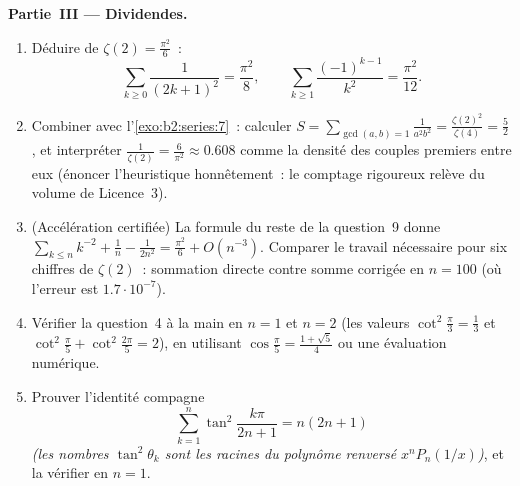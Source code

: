 \begin{problem}[{Problème du week-end --- $\zeta(2) = \pi^2/6$ et le
panorama de Bertrand}]
\medskip
\noindent\textbf{Partie~III --- Dividendes.}
\begin{enumerate}[resume]
  \item Déduire de $\zeta(2) = \frac{\pi^2}6$~:
        \[
        \sum_{k\geq0}\frac{1}{(2k+1)^2} = \frac{\pi^2}{8},
        \qquad
        \sum_{k\geq1}\frac{(-1)^{k-1}}{k^2} = \frac{\pi^2}{12}.
        \]
  \item Combiner avec l'\cref{exo:b2:series:7}~: calculer $S =
        \sum_{\gcd(a,b)=1}\frac{1}{a^2b^2} =
        \frac{\zeta(2)^2}{\zeta(4)} = \frac52$, et interpréter
        $\frac{1}{\zeta(2)} = \frac{6}{\pi^2} \approx 0.608$ comme
        la densité des couples premiers entre eux (énoncer
        l'heuristique honnêtement~: le comptage rigoureux relève du
        volume de Licence~3).
  \item (Accélération certifiée) La formule du reste de la question~9
        donne $\sum_{k\leq n}k^{-2} + \frac1n - \frac1{2n^2} =
        \frac{\pi^2}6 + O(n^{-3})$. Comparer le travail nécessaire
        pour six chiffres de $\zeta(2)$~: sommation directe contre
        somme corrigée en $n = 100$ (où l'erreur est
        $1.7\cdot10^{-7}$).
  \item Vérifier la question~4 à la main en $n = 1$ et $n = 2$ (les
        valeurs $\cot^2\frac\pi3 = \frac13$ et
        $\cot^2\frac\pi5 + \cot^2\frac{2\pi}5 = 2$), en utilisant
        $\cos\frac\pi5 = \frac{1+\sqrt5}4$ ou une évaluation
        numérique.
  \item Prouver l'identité compagne
        \[
        \sum_{k=1}^{n}\tan^2\frac{k\pi}{2n+1} = n(2n+1)
        \]
        \emph{(les nombres $\tan^2\theta_k$ sont les racines du
        polynôme renversé $x^nP_n(1/x)$)}, et la vérifier en $n = 1$.
\end{enumerate}


\end{problem}
